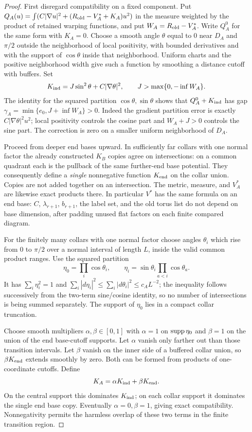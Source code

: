 \begin{proof}
First disregard compatibility on a fixed component.  Put
$Q_A(u)=\int(C|\nabla u|^2+
(R_{\rm old}-V_A^*+K_A)u^2)$ in the measure weighted by the product of retained warping functions, and put
$W_A=R_{\rm old}-V_A^*$. Write $Q_A^0$ for the same form with $K_A=0$.
Choose a smooth angle $\theta$ equal to
$0$ near $D_A$ and $\pi/2$ outside the neighborhood of local positivity,
with bounded derivatives and with the support of $\cos\theta$ inside
that neighborhood.  Uniform charts and the positive neighborhood
width give such a function by smoothing a distance cutoff with
buffers.  Set
\[
 K_{\rm ind}=J\sin^2\theta+C|\nabla\theta|^2,
 \qquad J>\max\{0,-\inf W_A\}.
\]
The identity for the squared partition $\cos\theta,\sin\theta$
shows that $Q_A^0+K_{\rm ind}$ has gap
$\gamma_A=\min\{e_0,J+\inf W_A\}>0$.  Indeed the gradient
partition error is exactly $C|\nabla\theta|^2u^2$; local positivity
controls the cosine part and $W_A+J>0$ controls the sine part.
The correction is zero on a smaller uniform neighborhood of $D_A$.

Proceed from deeper end bases upward.  In sufficiently far collars with one normal factor the already constructed $K_B$ copies agree on intersections:
on a common quadrant each is the pullback of the same further-end base
potential.  They consequently define a \emph{single} nonnegative
function $K_{\rm end}$ on the collar union.  Copies are not added
together on an intersection.  The metric, measure, and $V_A^*$ are
likewise exact products there.  In particular $V^*$ has the same
formula on an end base: $C$, $\lambda_{r+1}$, $b_{r+1}$, the label set,
and the old torus list do not depend on base dimension, after padding
unused flat factors on each finite compared diagram.

For the finitely many collars with one normal factor choose angles $\theta_i$
which rise from $0$ to $\pi/2$ over a normal interval of length $L$,
inside the valid common product ranges.  Use the squared partition
\[
 \eta_0=\prod_i\cos\theta_i,\qquad
 \eta_i=\sin\theta_i\prod_{a<i}\cos\theta_a.
\]
It has $\sum_i\eta_i^2=1$ and
$\sum_i|d\eta_i|^2\le\sum_i|d\theta_i|^2\le c_A L^{-2}$;
the inequality follows successively from the two-term sine/cosine
identity, so no number of intersections is being summed separately.
The support of $\eta_0$ lies in a compact collar truncation.

Choose smooth multipliers $\alpha,\beta\in[0,1]$ with $\alpha=1$
on $\operatorname{supp}\eta_0$ and $\beta=1$ on the union of the end base-cutoff
supports.  Let $\alpha$ vanish only farther out than those transition
intervals.  Let $\beta$ vanish on the inner side of a buffered collar
union, so $\beta K_{\rm end}$ extends smoothly by zero.  Both can be
formed from products of one-coordinate cutoffs.  Define
\[
 K_A=\alpha K_{\rm ind}+\beta K_{\rm end}.
\]
On the central support this dominates $K_{\rm ind}$; on each collar
support it dominates the single end base copy.  Eventually
$\alpha=0,\beta=1$, giving exact compatibility.  Nonnegativity permits
the harmless overlap of these two terms in the finite transition
region.


\end{proof}
